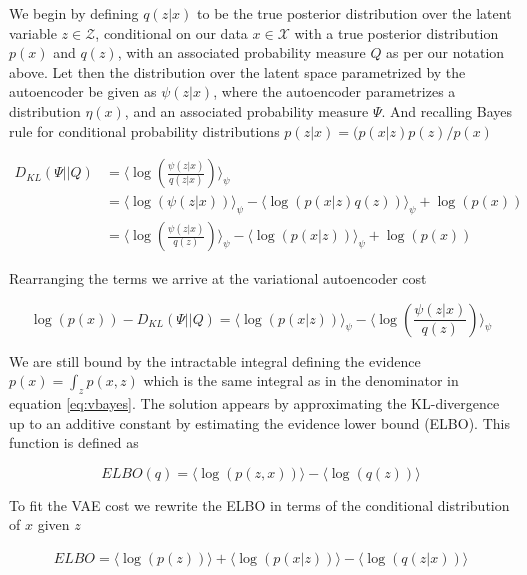 \noindent We begin by defining $q(z|x)$ to be the true posterior distribution over the latent variable $z \in \mathcal{Z}$, conditional on our data $x \in \mathcal{X}$ with a true posterior distribution $p(x)$ and $q(z)$, with an associated probability measure $Q$ as per our notation above. Let then the distribution over the latent space parametrized by the autoencoder be given as $\psi(z|x)$, where the autoencoder parametrizes a distribution $\eta(x)$, and an associated probability measure $\Psi$. And recalling Bayes rule for conditional probability distributions $p(z | x ) = (p(x | z) p(z) / p(x) $

\begin{align}
D_{KL}(\Psi || Q ) &= \langle \log \left(\frac{\psi(z|x)}{q(z|x)}\right) \rangle_\psi \\
&=  \langle \log \left( \psi(z|x)\right) \rangle_\psi - \langle \log \left( p( x | z) q(z) \right) \rangle_\psi + \log \left(p(x) \right) \\
&=  \langle \log \left(\frac{\psi(z|x)}{q(z)} \right) \rangle_\psi - \langle \log \left( p( x | z)\right) \rangle_\psi + \log \left(p(x) \right)
\end{align}

\noindent Rearranging the terms we arrive at the variational autoencoder cost

\begin{equation}\label{eq:vae_cost}
\log(p(x)) - D_{KL}(\Psi || Q )=  \langle \log \left( p( x | z)\right) \rangle_\psi - \langle \log \left(\frac{\psi(z|x)}{q(z)}\right)\rangle_\psi
\end{equation}
 

\noindent We are still bound by the intractable integral defining the evidence $p(x) = \int_z p(x, z)$ which is the same integral as in the denominator in equation \ref{eq:vbayes}. The solution appears by approximating the KL-divergence up to an additive constant by estimating the evidence lower bound (ELBO). This function is defined as 

\begin{equation}\label{eq:elbo}
ELBO(q) = \langle \log(p(z, x)) \rangle - \langle \log(q(z)) \rangle
\end{equation}

\noindent To fit the VAE cost we rewrite the ELBO in terms of the conditional distribution of $x$ given $z$

\begin{align}
ELBO = \langle \log(p(z)) \rangle +  \langle \log(p(x|z)) \rangle - \langle \log(q(z|x)) \rangle
\end{align}

